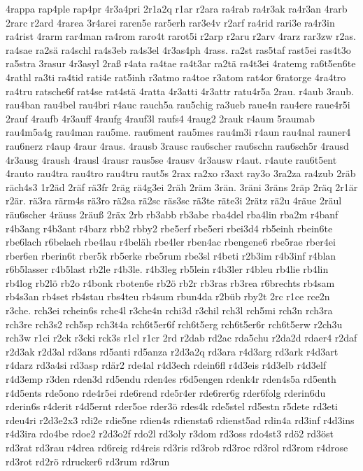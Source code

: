 {4rappa
rap4ple
rap4pr
4r3a4pri
2r1a2q
r1ar
r2ara
ra4rab
ra4r3ak
ra4r3an
4rarb
2rarc
r2ard
4rarea
3r4arei
raren5e
rar5erh
rar3e4v
r2arf
ra4rid
rari3e
ra4r3in
ra4rist
4rarm
rar4man
ra4rom
raro4t
rarot5i
r2arp
r2aru
r2arv
4rarz
rar3zw
r2as.
ra4sae
ra2sä
ra4schl
ra4s3eb
ra4s3el
4r3as4ph
4rass.
ra2st
ras5taf
rast5ei
ras4t3o
ra5stra
3rasur
4r3asyl
2raß
r4ata
ra4tae
ra4t3ar
ra2tä
ra4t3ei
4ratemg
ra6t5en6te
4rathl
ra3ti
ra4tid
rati4e
rat5inh
r3atmo
ra4toe
r3atom
rat4or
6ratorge
4ra4tro
ra4tru
ratsche6f
rat4se
rat4stä
4ratta
4r3atti
4r3attr
ratu4r5a
2rau.
r4aub
3raub.
rau4ban
rau4bel
rau4bri
r4auc
rauch5a
rau5chig
ra3ueb
raue4n
rau4ere
raue4r5i
2rauf
4raufb
4r3auff
4raufg
4rauf3l
raufs4
4raug2
2rauk
r4aum
5raumab
rau4m5a4g
rau4man
rau5me.
rau6ment
rau5mes
rau4m3i
r4aun
rau4nal
rauner4
rau6nerz
r4aup
4raur
4raus.
4rausb
3rausc
rau6scher
rau6schn
rau6sch5r
4rausd
4r3ausg
4raush
4rausl
4rausr
raus5se
4rausv
4r3ausw
r4aut.
r4aute
rau6t5ent
4rauto
rau4tra
rau4tro
rau4tru
raut5s
2rax
ra2xo
r3axt
ray3o
3ra2za
ra4zub
2räb
räch4s3
1r2äd
2räf
rä3fr
2räg
rä4g3ei
2räh
2räm
3rän.
3räni
3räns
2räp
2räq
2r1är
r2är.
rä3ra
rärm4s
rä3ro
rä2sa
rä2sc
räs3sc
rä3te
räte3i
2rätz
rä2u
4räue
2räul
räu6scher
4räuss
2räuß
2räx
2rb
rb3abb
rb3abe
rba4del
rba4lin
rba2m
r4banf
r4b3ang
r4b3ant
r4barz
rbb2
rbby2
rbe5erf
rbe5eri
rbei3d4
rb5einh
rbein6te
rbe6lach
r6belaeh
rbe4lau
r4beläh
rbe4ler
rben4ac
rbengene6
rbe5rae
rber4ei
rber6en
rberin6t
rber5k
rb5erke
rbe5rum
rbe3sl
r4beti
r2b3im
r4b3inf
r4blan
r6b5lasser
r4b5last
rb2le
r4b3le.
r4b3leg
rb5lein
r4b3ler
r4bleu
rb4lie
rb4lin
rb4log
rb2lö
rb2o
r4bonk
rboten6e
rb2ö
rb2r
rb3ras
rb3rea
r6brechts
rb4sam
rb4s3an
rb4set
rb4stau
rbs4teu
rb4sum
rbun4da
r2büb
rby2t
2rc
r1ce
rce2n
r3che.
rch3ei
rchein6s
rche4l
r3che4n
rchi3d
r3chil
rch3l
rch5mi
rch3n
rch3ra
rch3re
rch3s2
rch5sp
rch3t4a
rch6t5er6f
rch6t5erg
rch6t5er6r
rch6t5erw
r2ch3u
rch3w
r1ci
r2ck
r3cki
rck3s
r1cl
r1cr
2rd
r2dab
rd2ac
rda5chu
r2da2d
rdaer4
r2daf
r2d3ak
r2d3al
rd3ans
rd5anti
rd5anza
r2d3a2q
rd3ara
r4d3arg
rd3ark
r4d3art
r4darz
rd3a4si
rd3asp
rdär2
rde4al
r4d3ech
rdein6fl
r4d3eis
r4d3elb
r4d3elf
r4d3emp
r3den
rden3d
rd5endu
rden4es
r6d5engen
rdenk4r
rden4s5a
rd5enth
r4d5ents
rde5ono
rde4r5ei
rde6rend
rde5r4er
rde6rer6g
rder6folg
rderin6du
rderin6s
r4derit
r4d5ernt
rder5oe
rder3ö
rdes4k
rde5stel
rd5estn
r5dete
rd3eti
rdeu4ri
r2d3e2x3
rdi2e
rdie5ne
rdien4s
rdiensta6
rdienst5ad
rdin4a
rd3inf
r4d3ins
r4d3ira
rdo4be
rdoe2
r2d3o2f
rdo2l
rd3oly
r3dom
rd3oss
rdo4st3
rdö2
rd3öst
rd3rat
rd3rau
r4drea
rd6reig
rd4reis
rd3ris
rd3rob
rd3roc
rd3rol
rd3rom
r4drose
rd3rot
rd2rö
rdrucker6
rd3rum
rd3run
}
